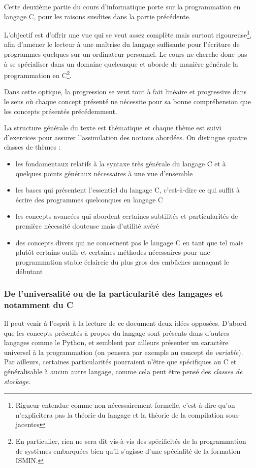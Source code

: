 \documentclass[../../main.tex]{subfiles}
\begin{document}
Cette deuxième partie du cours d'informatique porte sur la programmation en langage C, pour les raisons susdites dans la partie précédente.
 
L'objectif est d'offrir une vue qui se veut assez complète mais surtout rigoureuse\footnote{Rigueur entendue comme non nécessairement formelle, c'est-à-dire qu'on n'explicitera pas la théorie du langage et la théorie de la compilation sous-jacentes}, afin d'amener le lecteur à une maîtrise du langage suffisante pour l'écriture de programmes quelques sur un ordinateur personnel. Le cours ne cherche donc pas à se spécialiser dans un domaine quelconque et aborde de manière générale la programmation en C\footnote{En particulier, rien ne sera dit vis-à-vis des spécificités de la programmation de systèmes embarquées bien qu'il s'agisse d'une spécialité de la formation ISMIN.}.
 
Dans cette optique, la progression se veut tout à fait linéaire et progressive dans le sens où chaque concept présenté ne nécessite pour sa bonne compréhension que les concepts présentés précédemment.
 
La structure générale du texte est thématique et chaque thème est suivi d'exercices pour assurer l'assimilation des notions abordées. On distingue quatre classes de thèmes :
\begin{itemize}
	\item les fondamentaux relatifs à la syntaxe très générale du langage C et à quelques points généraux nécessaires à une vue d'ensemble
	\item les bases qui présentent l'essentiel du langage C, c'est-à-dire ce qui suffit à écrire des programmes quelconques en langage C
	\item les concepts avancées qui abordent certaines subtilités et particularités de première nécessité douteuse mais d'utilité avéré
	\item des concepts divers qui ne concernent pas le langage C en tant que tel mais plutôt certains outils et certaines méthodes nécessaires pour une programmation stable éclaircie du plus gros des embûches menaçant le débutant 
\end{itemize}
\subsubsection{De l'universalité ou de la particularité des langages et notamment du C}
 
Il peut venir à l'esprit à la lecture de ce document deux idées opposées. D'abord que les concepts présentés à propos du langage sont présents dans d'autres langages comme le Python, et semblent par ailleurs présenter un caractère universel à la programmation (on pensera par exemple au concept de \textit{variable}). Par ailleurs, certaines particularités pourraient n'être que spécifiques au C et généralisable à aucun autre langage, comme cela peut être pensé des \textit{classes de stockage}.
 
\end{document}
